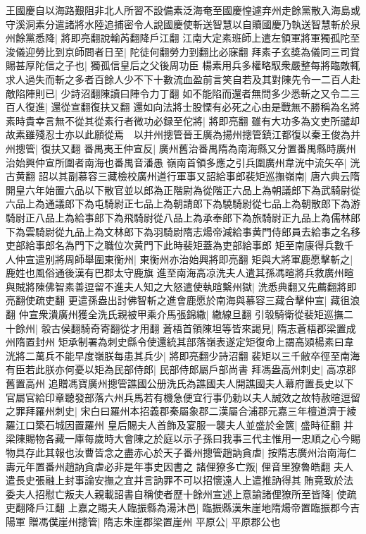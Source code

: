 王國慶自以海路艱阻非北人所習不設備素泛海奄至國慶惶遽弃州走餘黨散入海島或守溪洞素分遣諸將水陸追捕密令人說國慶使斬送智慧以自贖國慶乃執送智慧斬於泉州餘黨悉降|{
	將即亮翻說輸芮翻降戶江翻}
江南大定素班師上遣左領軍將軍獨孤陀至浚儀迎勞比到京師問者日至|{
	陀徒何翻勞力到翻比必寐翻}
拜素子玄奬為儀同三司賞賜甚厚陀信之子也|{
	獨孤信皇后之父後周功臣}
楊素用兵多權略馭衆嚴整每將臨敵輒求人過失而斬之多者百餘人少不下十數流血盈前言笑自若及其對陳先令一二百人赴敵陷陣則已|{
	少詩沼翻陳讀曰陣令力丁翻}
如不能陷而還者無問多少悉斬之又令二三百人復進|{
	還從宣翻復扶又翻}
還如向法將士股慄有必死之心由是戰無不勝稱為名將素時貴幸言無不從其從素行者微功必録至佗將|{
	將即亮翻}
雖有大功多為文吏所譴却故素雖殘忍士亦以此願從焉　以并州摠管晉王廣為揚州摠管鎮江都復以秦王俊為并州摠管|{
	復扶又翻}
番禺夷王仲宣反|{
	廣州舊治番禺隋為南海縣又分置番禺縣時廣州治始興仲宣所圍者南海也番禺音潘愚}
嶺南首領多應之引兵圍廣州韋洸中流矢卒|{
	洸古黄翻}
詔以其副慕容三藏檢校廣州道行軍事又詔給事郎裴矩巡撫嶺南|{
	唐六典云隋開皇六年始置六品以下散官並以郎為正階尉為從階正六品上為朝議郎下為武騎尉從六品上為通議郎下為屯騎尉正七品上為朝請郎下為驍騎尉從七品上為朝散郎下為游騎尉正八品上為給事郎下為飛騎尉從八品上為承奉郎下為旅騎尉正九品上為儒林郎下為雲騎尉從九品上為文林郎下為羽騎尉隋志煬帝減給事黄門侍郎員去給事之名移吏部給事郎名為門下之職位次黄門下此時裴矩蓋為吏部給事郎}
矩至南康得兵數千人仲宣遣别將周師舉圍東衡州|{
	東衡州亦治始興將即亮翻}
矩與大將軍鹿愿擊斬之|{
	鹿姓也風俗通後漢有巴郡太守鹿旗}
進至南海高凉洗夫人遣其孫馮暄將兵救廣州暄與賊將陳佛智素善逗留不進夫人知之大怒遣使執暄繫州獄|{
	洗悉典翻又先薦翻將即亮翻使疏吏翻}
更遣孫盎出討佛智斬之進會鹿愿於南海與慕容三藏合擊仲宣|{
	藏徂浪翻}
仲宣衆潰廣州獲全洗氏親被甲乘介馬張錦繖|{
	繖線旦翻}
引彀騎衛從裴矩巡撫二十餘州|{
	彀古侯翻騎奇寄翻從才用翻}
蒼梧首領陳坦等皆來謁見|{
	隋志蒼梧郡梁置成州隋置封州}
矩承制署為刺史縣令使還統其部落嶺表遂定矩復命上謂高熲楊素曰韋洸將二萬兵不能早度嶺朕每患其兵少|{
	將即亮翻少詩沼翻}
裴矩以三千敝卒徑至南海有臣若此朕亦何憂以矩為民部侍郎|{
	民部侍郎屬戶部尚書}
拜馮盎高州刺史|{
	高凉郡舊置高州}
追贈馮寶廣州摠管譙國公册洗氏為譙國夫人開譙國夫人幕府置長史以下官屬官給印章聽發部落六州兵馬若有機急便宜行事仍勅以夫人誠效之故特赦暄逗留之罪拜羅州刺史|{
	宋白曰羅州本招義郡秦屬象郡二漢屬合浦郡元嘉三年檀道濟于綾羅江口築石城因置羅州}
皇后賜夫人首飾及宴服一襲夫人並盛於金篋|{
	盛時征翻}
并梁陳賜物各藏一庫每歲時大會陳之於庭以示子孫曰我事三代主惟用一忠順之心今賜物具存此其報也汝曹皆念之盡赤心於天子番州摠管趙訥貪虐|{
	按隋志廣州治南海仁夀元年置番州趙訥貪虐必非是年事史因書之}
諸俚獠多亡叛|{
	俚音里獠魯皓翻}
夫人遣長史張融上封事論安撫之宜并言訥罪不可以招懷遠人上遣推訥得其賄竟致於法委夫人招慰亡叛夫人親載詔書自稱使者歷十餘州宣述上意諭諸俚獠所至皆降|{
	使疏吏翻降戶江翻}
上嘉之賜夫人臨振縣為湯沐邑|{
	臨振縣漢朱崖地隋煬帝置臨振郡今吉陽軍}
贈馮僕崖州摠管|{
	隋志朱崖郡梁置崖州}
平原公|{
	平原郡公也}



